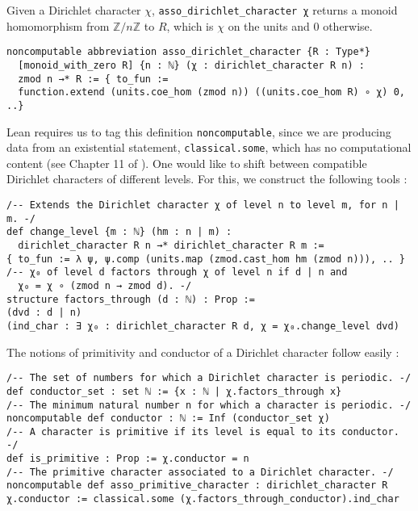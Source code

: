 \documentclass[a4paper,UKenglish,cleveref, autoref, thm-restate]{lipics-v2021}
\newcommand{\lean}[1]{\texttt{#1}\xspace} %
\begin{document}
Given a Dirichlet character $\chi$, \lean{asso\_dirichlet\_character χ} returns a monoid homomorphism from $\mathbb{Z}/n \mathbb{Z}$ 
to $R$, which is $\chi$ on the units and 0 otherwise. 
\begin{lstlisting}
noncomputable abbreviation asso_dirichlet_character {R : Type*} 
  [monoid_with_zero R] {n : ℕ} (χ : dirichlet_character R n) : 
  zmod n →* R := { to_fun := 
  function.extend (units.coe_hom (zmod n)) ((units.coe_hom R) ∘ χ) 0, ..}
\end{lstlisting}
Lean requires us to tag this definition \lean{noncomputable}, since we are producing data from an existential statement, 
\lean{classical.some}, which has no computational content (see Chapter 11 of \cite{TPIL}).
One would like to shift between compatible Dirichlet characters of different levels. For this, we construct the following tools : 
\begin{lstlisting}
/-- Extends the Dirichlet character χ of level n to level m, for n | m. -/
def change_level {m : ℕ} (hm : n | m) : 
  dirichlet_character R n →* dirichlet_character R m :=
{ to_fun := λ ψ, ψ.comp (units.map (zmod.cast_hom hm (zmod n))), .. }
/-- χ₀ of level d factors through χ of level n if d | n and 
  χ₀ = χ ∘ (zmod n → zmod d). -/
structure factors_through (d : ℕ) : Prop :=
(dvd : d | n) 
(ind_char : ∃ χ₀ : dirichlet_character R d, χ = χ₀.change_level dvd)
\end{lstlisting}
The notions of primitivity and conductor of a Dirichlet character follow easily : \newpage
\begin{lstlisting}
/-- The set of numbers for which a Dirichlet character is periodic. -/
def conductor_set : set ℕ := {x : ℕ | χ.factors_through x}
/-- The minimum natural number n for which a character is periodic. -/
noncomputable def conductor : ℕ := Inf (conductor_set χ)
/-- A character is primitive if its level is equal to its conductor. -/
def is_primitive : Prop := χ.conductor = n
/-- The primitive character associated to a Dirichlet character. -/
noncomputable def asso_primitive_character : dirichlet_character R χ.conductor := classical.some (χ.factors_through_conductor).ind_char
\end{lstlisting}
\end{document}
